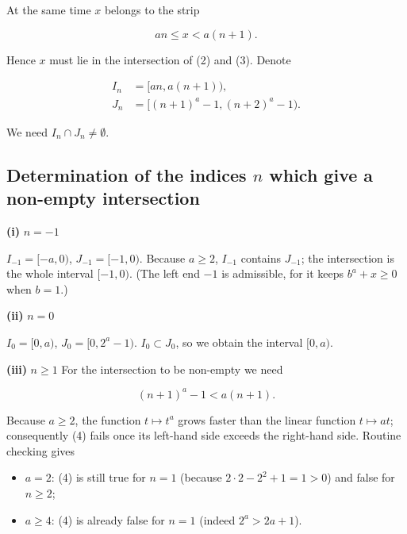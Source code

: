 \documentclass[12pt,a4paper]{article}
\theoremstyle{definition}
\begin{document}
        At the same time $x$ belongs to the strip

        \begin{equation}
            a n \leq x < a(n+1).
        \end{equation}

        Hence $x$ must lie in the intersection of (2) and (3).
        Denote

        \begin{align}
            I_n &= [a n , a(n+1)), \\
            J_n &= [(n+1)^a-1 , (n+2)^a-1).
        \end{align}

        We need $I_n \cap J_n \neq \emptyset$.

        \subsection*{Determination of the indices $n$ which give a non-empty intersection}

        \textbf{(i)} $n = -1$

        $I_{-1}= [-a,0)$, $J_{-1}= [-1,0)$.
        Because $a\geq 2$, $I_{-1}$ contains $J_{-1}$; the intersection is the whole
        interval $[-1,0)$.
        (The left end $-1$ is admissible, for it keeps $b^{a}+x \geq 0$ when $b=1$.)

        \textbf{(ii)} $n = 0$

        $I_0=[0,a)$, $J_0=[0,2^a-1)$.
        $I_0\subset J_0$, so we obtain the interval $[0,a)$.

        \textbf{(iii)} $n \geq 1$
        For the intersection to be non-empty we need

        \begin{equation}
        (n+1)^a-1 < a(n+1).
        \end{equation}

        Because $a\geq 2$, the function $t\mapsto t^a$ grows faster than the linear
        function $t\mapsto a t$; consequently (4) fails once its left-hand side
        exceeds the right-hand side. Routine checking gives

        \begin{itemize}
            \item $a = 2$: (4) is still true for $n = 1$ (because $2 \cdot 2 - 2^2 +1 = 1>0$)
            and false for $n \geq 2$;

            \item $a \geq 4$: (4) is already false for $n = 1$ (indeed $2^a > 2a+1$).
        \end{itemize}
\end{document}
